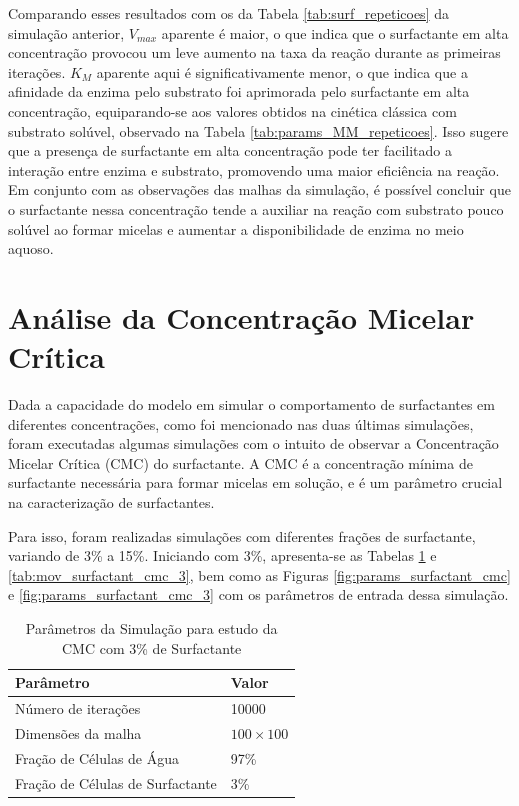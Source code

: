 \documentclass[12pt,oneside]{report}
\begin{document}
Comparando esses resultados com os da Tabela \ref{tab:surf_repeticoes} da simulação anterior, $V_{max}$ aparente é maior, o que indica que o surfactante em alta concentração provocou um leve aumento na taxa da reação durante as primeiras iterações. $K_M$ aparente aqui é significativamente menor, o que indica que a afinidade da enzima pelo substrato foi aprimorada pelo surfactante em alta concentração, equiparando-se aos valores obtidos na cinética clássica com substrato solúvel, observado na Tabela \ref{tab:params_MM_repeticoes}. Isso sugere que a presença de surfactante em alta concentração pode ter facilitado a interação entre enzima e substrato, promovendo uma maior eficiência na reação. Em conjunto com as observações das malhas da simulação, é possível concluir que o surfactante nessa concentração tende a auxiliar na reação com substrato pouco solúvel ao formar micelas e aumentar a disponibilidade de enzima no meio aquoso.

\section{Análise da Concentração Micelar Crítica}

Dada a capacidade do modelo em simular o comportamento de surfactantes em diferentes concentrações, como foi mencionado nas duas últimas simulações, foram executadas algumas simulações com o intuito de observar a Concentração Micelar Crítica (CMC) do surfactante. A CMC é a concentração mínima de surfactante necessária para formar micelas em solução, e é um parâmetro crucial na caracterização de surfactantes.

Para isso, foram realizadas simulações com diferentes frações de surfactante, variando de 3\% a 15\%. Iniciando com 3\%, apresenta-se as Tabelas \ref{tab:params_surfactant_cmc} e \ref{tab:mov_surfactant_cmc_3}, bem como as Figuras \ref{fig:params_surfactant_cmc} e \ref{fig:params_surfactant_cmc_3} com os parâmetros de entrada dessa simulação.

\begin{table}[H]
    \centering
    \caption{Parâmetros da Simulação para estudo da CMC com 3\% de Surfactante}
    \vspace{0.2cm}
    \begin{tabularx}{\textwidth}{X m{5cm}}
        \hline
        \textbf{Parâmetro}               & \textbf{Valor}   \\
        \hline
        Número de iterações              & 10000            \\
        Dimensões da malha               & $100 \times 100$ \\
        Fração de Células de Água        & 97\%             \\
        Fração de Células de Surfactante & 3\%              \\
        \hline
    \end{tabularx}
    \vspace{0.2cm}
    \label{tab:params_surfactant_cmc}
\end{table}
\end{document}
